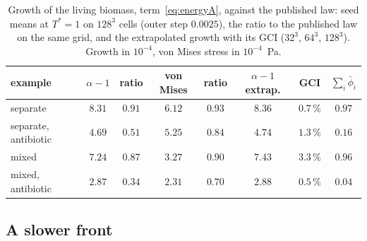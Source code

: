 \documentclass[11pt,a4paper]{article}
\newcommand{\lv}{\textstyle\sum_i\bar\phi_i}
\begin{document}
\begin{table}[tbp]
  \centering
  \caption{Growth of the living biomass, term~\eqref{eq:energyA}, against the published law: seed means at $T^*=1$ on $128^3$ cells (outer step $0.0025$), the ratio to the published law on the same grid, and the extrapolated growth with its GCI ($32^3$, $64^3$, $128^3$). Growth in $10^{-4}$, von Mises stress in $10^{-4}$~Pa.}
  \label{tab:living}
  \begin{tabular}{lccccccc}
    \toprule
    example & $\alpha-1$ & ratio & von Mises & ratio & $\alpha-1$ extrap. & GCI & $\lv$ \\
    \midrule
    separate & $8.31$ & $0.91$ & $6.12$ & $0.93$ & $8.36$ & $0.7\,\%$ & $0.97$ \\
    separate, antibiotic & $4.69$ & $0.51$ & $5.25$ & $0.84$ & $4.74$ & $1.3\,\%$ & $0.16$ \\
    mixed & $7.24$ & $0.87$ & $3.27$ & $0.90$ & $7.43$ & $3.3\,\%$ & $0.96$ \\
    mixed, antibiotic & $2.87$ & $0.34$ & $2.31$ & $0.70$ & $2.88$ & $0.5\,\%$ & $0.04$ \\
    \bottomrule
  \end{tabular}
\end{table}

\subsection{A slower front}
\label{sec:frontspeed}
\end{document}

